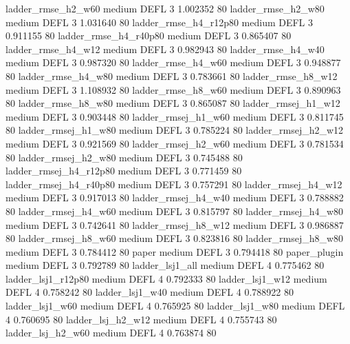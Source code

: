     ladder_rmse_h2_w60     medium     DEFL                 3 1.002352 80
    ladder_rmse_h2_w80     medium     DEFL                 3 1.031640 80
 ladder_rmse_h4_r12p80     medium     DEFL                 3 0.911155 80
 ladder_rmse_h4_r40p80     medium     DEFL                 3 0.865407 80
    ladder_rmse_h4_w12     medium     DEFL                 3 0.982943 80
    ladder_rmse_h4_w40     medium     DEFL                 3 0.987320 80
    ladder_rmse_h4_w60     medium     DEFL                 3 0.948877 80
    ladder_rmse_h4_w80     medium     DEFL                 3 0.783661 80
    ladder_rmse_h8_w12     medium     DEFL                 3 1.108932 80
    ladder_rmse_h8_w60     medium     DEFL                 3 0.890963 80
    ladder_rmse_h8_w80     medium     DEFL                 3 0.865087 80
   ladder_rmsej_h1_w12     medium     DEFL                 3 0.903448 80
   ladder_rmsej_h1_w60     medium     DEFL                 3 0.811745 80
   ladder_rmsej_h1_w80     medium     DEFL                 3 0.785224 80
   ladder_rmsej_h2_w12     medium     DEFL                 3 0.921569 80
   ladder_rmsej_h2_w60     medium     DEFL                 3 0.781534 80
   ladder_rmsej_h2_w80     medium     DEFL                 3 0.745488 80
ladder_rmsej_h4_r12p80     medium     DEFL                 3 0.771459 80
ladder_rmsej_h4_r40p80     medium     DEFL                 3 0.757291 80
   ladder_rmsej_h4_w12     medium     DEFL                 3 0.917013 80
   ladder_rmsej_h4_w40     medium     DEFL                 3 0.788882 80
   ladder_rmsej_h4_w60     medium     DEFL                 3 0.815797 80
   ladder_rmsej_h4_w80     medium     DEFL                 3 0.742641 80
   ladder_rmsej_h8_w12     medium     DEFL                 3 0.986887 80
   ladder_rmsej_h8_w60     medium     DEFL                 3 0.823816 80
   ladder_rmsej_h8_w80     medium     DEFL                 3 0.784412 80
                 paper     medium     DEFL                 3 0.794418 80
          paper_plugin     medium     DEFL                 3 0.792789 80
       ladder_lsj1_all     medium     DEFL                 4 0.775462 80
    ladder_lsj1_r12p80     medium     DEFL                 4 0.792333 80
       ladder_lsj1_w12     medium     DEFL                 4 0.758242 80
       ladder_lsj1_w40     medium     DEFL                 4 0.788922 80
       ladder_lsj1_w60     medium     DEFL                 4 0.765925 80
       ladder_lsj1_w80     medium     DEFL                 4 0.760695 80
     ladder_lsj_h2_w12     medium     DEFL                 4 0.755743 80
     ladder_lsj_h2_w60     medium     DEFL                 4 0.763874 80
